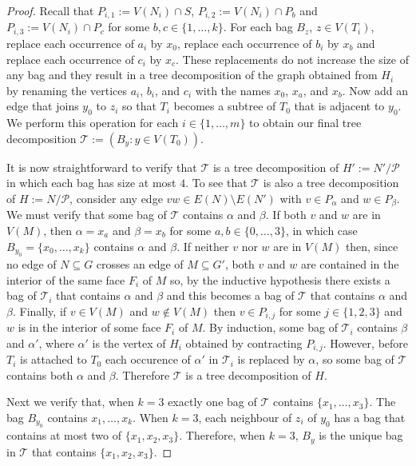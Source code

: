 \documentclass{patmorin}
\theoremstyle{plain}
\theoremstyle{definition}
\begin{document}
\begin{proof}
	Recall that $P_{i,1}:=V(N_i)\cap S$, $P_{i,2}:=V(N_i)\cap P_b$ and $P_{i,3}:=V(N_i)\cap P_c$ for some $b,c\in\{1,\ldots,k\}$.  For each bag $B_z$, $z\in V(T_i)$, replace each occurrence of $a_i$ by $x_0$, replace each occurrence of $b_i$ by $x_b$ and replace each occurrence of $c_i$ by $x_c$.  These replacements do not increase the size of any bag and they result in a tree decomposition of the graph obtained from $H_i$ by renaming the vertices $a_i$, $b_i$, and $c_i$ with the names $x_0$, $x_a$, and $x_b$. Now add an edge that joins $y_0$ to $z_i$ so that $T_i$ becomes a subtree of $T_0$ that is adjacent to $y_0$.  We perform this operation for each $i\in\{1,\ldots,m\}$ to obtain our final tree decomposition $\mathcal{T}:=(B_y:y\in V(T_0))$.

  It is now straightforward to verify that $\mathcal{T}$ is a tree decomposition of $H':=N'/\mathcal{P}$ in which each bag has size at most $4$.    To see that $\mathcal{T}$ is also a tree decomposition of $H:=N/\mathcal{P}$, consider any edge $vw\in E(N)\setminus E(N')$ with $v\in P_\alpha$ and $w\in P_\beta$.  We must verify that some bag of $\mathcal{T}$ contains $\alpha$ and $\beta$.  If both $v$ and $w$ are in $V(M)$, then $\alpha=x_a$ and $\beta=x_b$ for some $a,b\in\{0,\ldots,3\}$, in which case $B_{y_0}=\{x_0,\ldots,x_k\}$ contains $\alpha$ and $\beta$.  If neither $v$ nor $w$ are in $V(M)$ then, since no edge of $N\subseteq G$ crosses an edge of $M\subseteq G'$, both $v$ and $w$ are contained in the interior of the same face $F_i$ of $M$ so, by the inductive hypothesis there exists a bag of $\mathcal{T}_i$ that contains $\alpha$ and $\beta$ and this becomes a bag of $\mathcal{T}$ that contains $\alpha$ and $\beta$.  Finally, if $v\in V(M)$ and $w\not\in V(M)$ then $v\in P_{i,j}$ for some $j\in\{1,2,3\}$ and $w$ is in the interior of some face $F_i$ of $M$. By induction, some bag of $\mathcal{T}_i$ contains $\beta$ and $\alpha'$, where $\alpha'$ is the vertex of $H_i$ obtained by contracting $P_{i,j}$.  However, before $T_i$ is attached to $T_0$ each occurence of $\alpha'$ in $\mathcal{T}_i$ is replaced by $\alpha$, so some bag of $\mathcal{T}$ contains both $\alpha$ and $\beta$. Therefore $\mathcal{T}$ is a tree decomposition of $H$.

  Next we verify that, when $k=3$ exactly one bag of $\mathcal{T}$ contains $\{x_1,\ldots,x_3\}$.  The bag $B_{y_0}$ contains $x_1,\ldots,x_k$. When $k=3$, each neighbour of $z_i$ of $y_0$ has a bag that contains at most two of $\{x_1,x_2,x_3\}$.  Therefore, when $k=3$, $B_y$ is the unique bag in $\mathcal{T}$ that contains $\{x_1,x_2,x_3\}$.


\end{proof}
\end{document}
